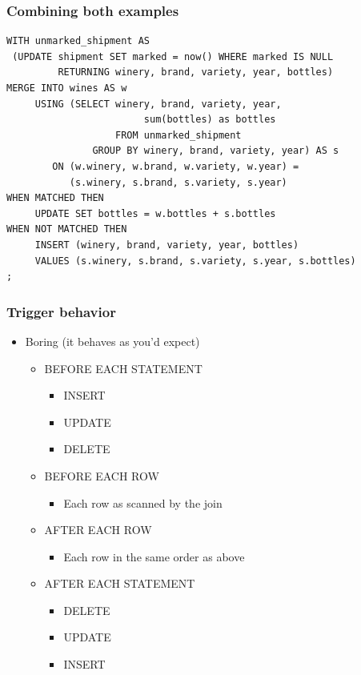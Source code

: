 \documentclass[ignorenonframetext,t]{beamer}
\begin{document}
\begin{frame}[fragile]
  \frametitle{Combining both examples}

  \begin{lstlisting}
WITH unmarked_shipment AS
 (UPDATE shipment SET marked = now() WHERE marked IS NULL
         RETURNING winery, brand, variety, year, bottles)
MERGE INTO wines AS w
     USING (SELECT winery, brand, variety, year,
                        sum(bottles) as bottles
                   FROM unmarked_shipment
               GROUP BY winery, brand, variety, year) AS s
        ON (w.winery, w.brand, w.variety, w.year) =
           (s.winery, s.brand, s.variety, s.year)
WHEN MATCHED THEN
     UPDATE SET bottles = w.bottles + s.bottles
WHEN NOT MATCHED THEN
     INSERT (winery, brand, variety, year, bottles)
     VALUES (s.winery, s.brand, s.variety, s.year, s.bottles)
;
  \end{lstlisting}
\end{frame}

\begin{frame}
  \frametitle{Trigger behavior}

  \begin{itemize}
    \item Boring (it behaves as you'd expect)
      \begin{itemize}
	\item BEFORE EACH STATEMENT
	  \begin{itemize}
	    \item INSERT
	    \item UPDATE
	    \item DELETE
	  \end{itemize}
	\item BEFORE EACH ROW
	\begin{itemize} \item Each row as scanned by the join
	\end{itemize}
      \item AFTER EACH ROW
      \begin{itemize} \item Each row in the same order as above \end{itemize}
	  \item AFTER EACH STATEMENT
	    \begin{itemize}
	      \item DELETE
	      \item UPDATE
	      \item INSERT
	    \end{itemize}
      \end{itemize}
  \end{itemize}
\end{frame}
\end{document}
